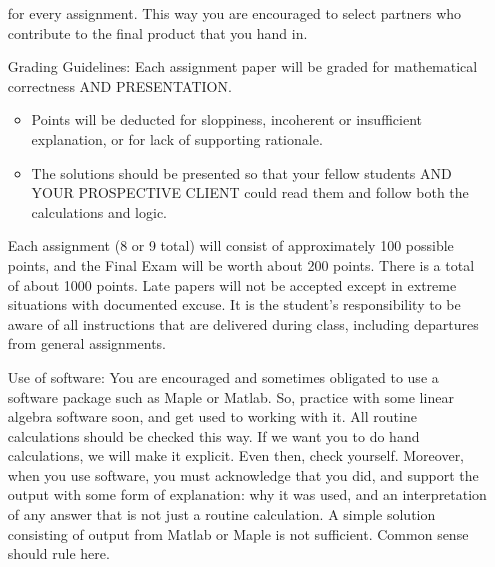 \documentclass[12pt]{report}
\begin{document}
\begin{itemize}
for every assignment.  This way you are encouraged to select
partners who contribute to the final product that you hand in.
\item[Grading Guidelines:] Each assignment paper will be graded for
mathematical correctness AND PRESENTATION.  
  \begin{itemize}
    \item
      Points will be deducted for sloppiness, incoherent or insufficient explanation, or for lack of supporting rationale.  
    \item 
      The solutions should be presented so that your fellow students AND YOUR PROSPECTIVE CLIENT could read them and follow both the calculations and logic.\\
\end{itemize}
Each assignment (8 or 9 total) will consist of approximately 100 
possible points, and the Final Exam will be worth about 200 points.  
There is a total of about 1000 points. 
Late papers will not be accepted except in extreme
situations with documented excuse. 
It is the student's
responsibility to be aware of all instructions that are delivered
during class, including departures from general assignments.
\item[Use of software:]
You are encouraged and sometimes obligated to use a 
software package such as Maple or Matlab.  So, practice with 
some linear algebra software soon, and get used to working with
it.  All routine calculations should be checked this way.  If
we want you to do hand calculations, we will make it explicit.
Even then, check yourself.  Moreover, when you use software, you
must acknowledge that you did, and support the output with some
form of explanation:  why it was used, and an interpretation of
any answer that is not just a routine calculation.  A simple
solution consisting of output from Matlab or Maple is not sufficient.
Common sense should rule here.
\end{itemize}
\end{document}

